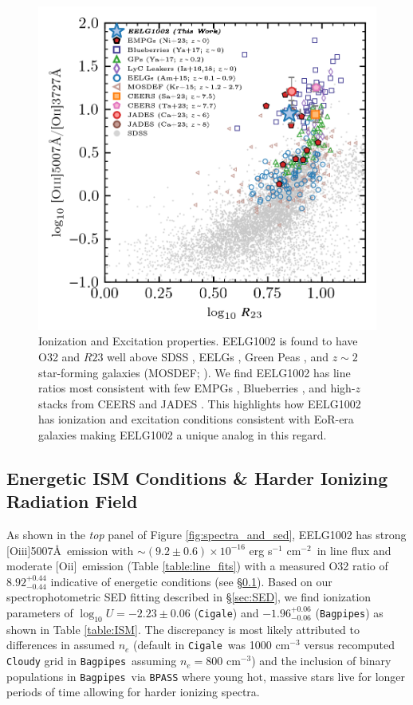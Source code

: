 \documentclass[twocolumn,tight,times,linenumbers]{aastex631}
\newcommand{\oii}{[O{\sc ii}]}
\newcommand{\oiii}{[O{\sc iii}]}
\newcommand{\cgsline}{erg s$^{-1}$ cm$^{-2}$}
\newcommand{\cigale}{\texttt{Cigale}}
\newcommand{\bagpipes}{\texttt{Bagpipes}}
\begin{document}
			\begin{figure}
				\centering
				\includegraphics[width=\columnwidth]{figures/O32_R23.png}
				\caption{Ionization and Excitation properties. EELG1002 is found to have O32 and $R23$ well above SDSS \citep{Thomas2013}, EELGs \citep{Amorin2015}, Green Peas \citep{Yang2017_GP}, and $z \sim 2$ star-forming galaxies (MOSDEF; \citealt{Kriek2015}). We find EELG1002 has line ratios most consistent with few EMPGs \citep{Nishigaki2023}, Blueberries \citep{Yang2017_BB}, and high-$z$ stacks from CEERS \citep{Sanders2023,Tang2023} and JADES \citep{Cameron2023}. This highlights how EELG1002 has ionization and excitation conditions consistent with EoR-era galaxies making EELG1002 a unique analog in this regard.}
				\label{fig:o32_r23}
			\end{figure}
		
		\subsection{Energetic ISM Conditions \& Harder Ionizing Radiation Field}
		\label{sec:ionization}
		
		As shown in the \textit{top} panel of Figure \ref{fig:spectra_and_sed}, EELG1002 has strong \oiii5007\AA~emission with $\sim (9.2 \pm0.6) \times 10^{-16}$ \cgsline~in line flux and moderate \oii~emission (Table \ref{table:line_fits}) with a measured O32 ratio of $8.92^{+0.44}_{-0.44}$ indicative of energetic conditions (see \S\ref{sec:ionization}). Based on our spectrophotometric SED fitting described in \S\ref{sec:SED}, we find ionization parameters of $\log_{10} U = -2.23 \pm 0.06$ (\cigale) and $-1.96^{+0.06}_{-0.06}$ (\bagpipes) as shown in Table \ref{table:ISM}. The discrepancy is most likely attributed to differences in assumed $n_e$ (default in \cigale~was 1000 cm$^{-3}$ versus recomputed \texttt{Cloudy} grid in \bagpipes~assuming $n_e = 800$ cm$^{-3}$) and the inclusion of binary populations in \bagpipes~via \texttt{BPASS} where young hot, massive stars live for longer periods of time allowing for harder ionizing spectra.
		
\end{document}
